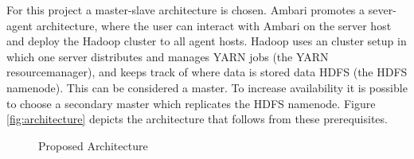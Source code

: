 For this project a master-slave architecture is chosen.
Ambari promotes a sever-agent architecture, 
where the user can interact with Ambari on the server host 
and deploy the Hadoop cluster to all agent hosts.
Hadoop uses an cluster setup in which one server distributes and manages \ac{YARN} jobs (the \ac{YARN} resourcemanager), 
and keeps track of where data is stored data \ac{HDFS} (the \ac{HDFS} namenode).
This can be considered a master.
To increase availability it is possible to choose a secondary master which replicates the \ac{HDFS} namenode.
Figure \vref{fig:architecture} depicts the architecture that follows from these prerequisites.

\begin{figure}
	\caption{\label{fig:architecture}Proposed Architecture}
\end{figure}

